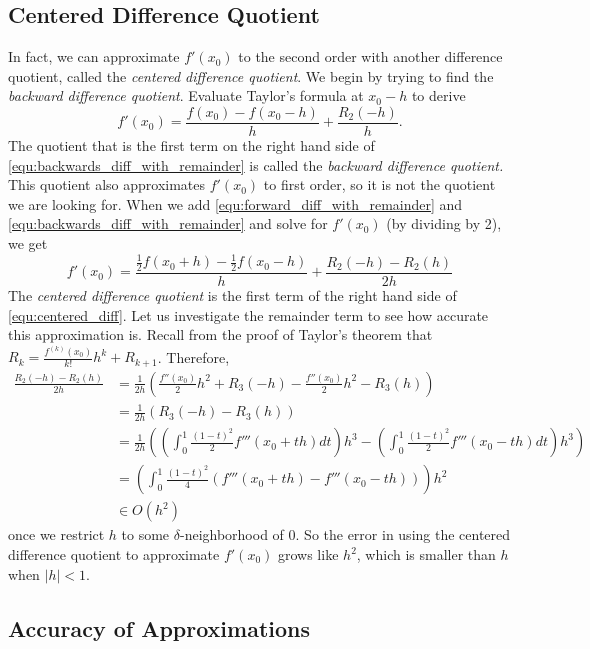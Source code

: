 \subsection*{Centered Difference Quotient}
In fact, we can approximate $f'(x_0)$ to the second order with another difference quotient, called the \emph{centered difference quotient}.  We begin by trying to find the \emph{backward difference quotient}.
Evaluate Taylor's formula at $x_0-h$ to derive
\begin{equation}\label{equ:backwards_diff_with_remainder}
f'(x_0) = \frac{f(x_0)-f(x_0-h)}{h} + \frac{R_2(-h)}{h}.
\end{equation}
The quotient that is the first term on the right hand side of \eqref{equ:backwards_diff_with_remainder} is called the \emph{backward difference quotient.} 
This quotient also approximates $f'(x_0)$ to first order, so it is not the quotient we are looking for.
When we add \eqref{equ:forward_diff_with_remainder} and \eqref{equ:backwards_diff_with_remainder} and solve for $f'(x_0)$ (by dividing by 2), we get
\begin{equation}\label{equ:centered_diff}
f'(x_0) = \frac{\frac{1}{2}f(x_0+h) - \frac{1}{2}f(x_0-h)}{h} + \frac{R_2(-h) - R_2(h)}{2h}
\end{equation}
The \emph{centered difference quotient} is the first term of the right hand side of \eqref{equ:centered_diff}. 
Let us investigate the remainder term to see how accurate this approximation is. 
Recall from the proof of Taylor's theorem that $R_k = \frac{f^{(k)}(x_0)}{k!}h^k + R_{k+1}$. Therefore,
\begin{align*}
\frac{R_2(-h) - R_2(h)}{2h} &= \frac{1}{2h}\left(\frac{f''(x_0)}{2}h^2 + R_{3}(-h) - \frac{f''(x_0)}{2}h^2 - R_{3}(h) \right)\\
&= \frac{1}{2h} ( R_3(-h)-R_3(h))\\
&= \frac{1}{2h}\left(  \left( \int_0^1 \frac{(1-t)^2}{2} f'''(x_0+th) dt \right) h^3  -  \left(\int_0^1 \frac{(1-t)^2}{2} f'''(x_0-th) dt \right) h^3  \right)\\
&= \left(  \int_0^1 \frac{(1-t)^2}{4}( f'''(x_0+th)-f'''(x_0-th)) \right)h^2\\
&{\in}   O(h^2)
\end{align*}
once we restrict $h$ to some $\delta$-neighborhood of 0. 
So the error in using the centered difference quotient to approximate $f'(x_0)$ grows like $h^2$, which is smaller than $h$ when $|h|<1$.

\subsection*{Accuracy of Approximations}

